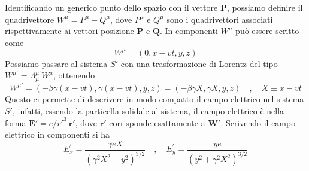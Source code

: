 Identificando un generico punto dello spazio con il vettore $\mathbf{P}$, possiamo definire il quadrivettore $W^\mu = P^\mu - Q^\mu$, dove $P^\mu$ e $Q^\mu$ sono i quadrivettori associati rispettivamente ai vettori posizione $\mathbf{P}$ e $\mathbf{Q}$. In componenti $W^\mu$ può essere scritto come
\begin{equation*}
    W^\mu = (0, x - vt, y, z)
\end{equation*}
Possiamo passare al sistema $S'$ con una trasformazione di Lorentz del tipo $W^{\mu'} = \Lambda^{\mu'}_{\mu} W^{\mu}$, ottenendo 
\begin{equation*}
    W^{\mu'} = (- \beta \gamma (x - vt), \gamma(x - vt), y, z) = (- \beta \gamma X , \gamma X, y, z) \quad ,\quad X \equiv x - vt
\end{equation*}
Questo ci permette di descrivere in modo compatto il campo elettrico nel sistema $S'$, infatti, essendo la particella solidale al sistema, il campo elettrico è nella forma $\mathbf{E}' = e/r'^3 \ \mathbf{r}'$, dove $\mathbf{r}'$ corrisponde esattamente a $\mathbf{W}'$. Scrivendo il campo elettrico in componenti si ha 
\begin{equation}
    E_x^{\prime} =\frac{\gamma e X}{\left(\gamma^2 X^2 + y^2\right)^{3 / 2}} \quad , \quad E_y^{\prime}=\frac{y e}{\left(y^2+\gamma^2 X^2\right)^{3 / 2}}
\end{equation}

